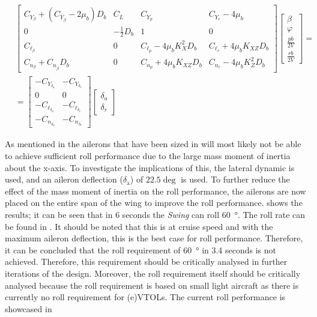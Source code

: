 \begin{equation}
\label{eq:dynamic:EOM:Lat}
\begin{aligned}
& {\left[\begin{array}{cccc}
C_{Y_\beta}+\left(C_{Y_{\dot{\beta}}}-2 \mu_b\right) D_b & C_L & C_{Y_p} & C_{Y_r}-4 \mu_b \\
0 & -\frac{1}{2} D_b & 1 & 0 \\
C_{\ell_\beta} & 0 & C_{\ell_p}-4 \mu_b K_X^2 D_b & C_{\ell_r}+4 \mu_b K_{X Z} D_b \\
C_{n_\beta}+C_{n_{\dot{\beta}}} D_b & 0 & C_{n_p}+4 \mu_b K_{X Z} D_b & C_{n_r}-4 \mu_b K_Z^2 D_b
\end{array}\right]\left[\begin{array}{c}
\beta \\
\varphi \\
\frac{p b}{2 V} \\
\frac{r b}{2 V}
\end{array}\right]=} \\
&=\left[\begin{array}{cc}
-C_{Y_{\delta_a}} & -C_{Y_{\delta_r}} \\
0 & 0 \\
-C_{\ell_{\delta_a}} & -C_{\ell_{\delta_r}} \\
-C_{n_{\delta_a}} & -C_{n_{\delta_r}}
\end{array}\right]\left[\begin{array}{c}
\delta_a \\
\delta_r
\end{array}\right]
\end{aligned}
\end{equation}


As mentioned in  the ailerons that have been sized in  will most likely not be able to achieve sufficient roll performance due to the large mass moment of inertia about the x-axis.
To investigate the implications of this, the lateral dynamic is used, and an aileron deflection ($\delta_{\text{a}}$) of $22.5 \deg$ is used.
To further reduce the effect of the mass moment of inertia on the roll performance, the ailerons are now placed on the entire span of the wing to improve the roll performance.
 shows the results; it can be seen that in 6 seconds the \textit{Swing} can roll \qty{60}{\degree}.
The roll rate can be found in .
It should be noted that this is at cruise speed and with the maximum aileron deflection, this is the best case for roll performance.
Therefore, it can be concluded that the roll requirement of \qty{60}{\degree} in 3.4 seconds is not achieved.
Therefore, this requirement should be critically analysed in further iterations of the design.
Moreover, the roll requirement itself should be critically analysed because the roll requirement is based on small light aircraft as there is currently no roll requirement for (e)VTOLs.
The current roll performance is showcased in 



